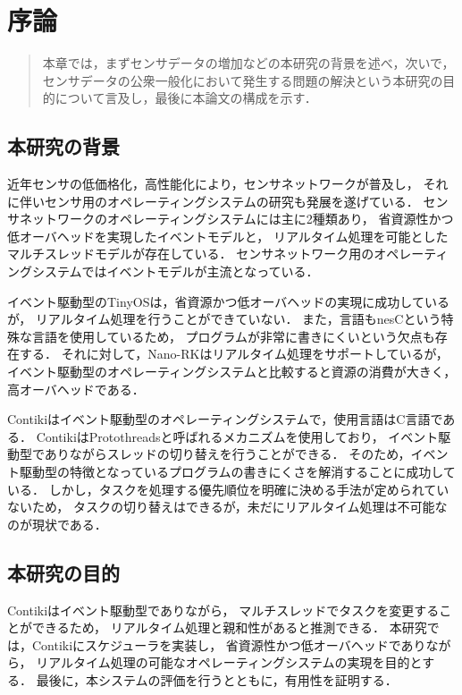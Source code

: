 \chapter{序論}
\begin{large}
\begin{quote}
本章では，まずセンサデータの増加などの本研究の背景を述べ，次いで，センサデータの公衆一般化において発生する問題の解決という本研究の目的について言及し，最後に本論文の構成を示す．
\end{quote}
\end{large}
\clearpage

\section{本研究の背景}
近年センサの低価格化，高性能化により，センサネットワークが普及し，
それに伴いセンサ用のオペレーティングシステムの研究も発展を遂げている．
センサネットワークのオペレーティングシステムには主に2種類あり，
省資源性かつ低オーバヘッドを実現したイベントモデルと，
リアルタイム処理を可能としたマルチスレッドモデルが存在している．
センサネットワーク用のオペレーティングシステムではイベントモデルが主流となっている．

イベント駆動型のTinyOSは，省資源かつ低オーバヘッドの実現に成功しているが，
リアルタイム処理を行うことができていない．
また，言語もnesCという特殊な言語を使用しているため，
プログラムが非常に書きにくいという欠点も存在する．
それに対して，Nano-RKはリアルタイム処理をサポートしているが，
イベント駆動型のオペレーティングシステムと比較すると資源の消費が大きく，
高オーバヘッドである．

Contikiはイベント駆動型のオペレーティングシステムで，使用言語はC言語である．
ContikiはProtothreadsと呼ばれるメカニズムを使用しており，
イベント駆動型でありながらスレッドの切り替えを行うことができる．
そのため，イベント駆動型の特徴となっているプログラムの書きにくさを解消することに成功している．
しかし，タスクを処理する優先順位を明確に決める手法が定められていないため，
タスクの切り替えはできるが，未だにリアルタイム処理は不可能なのが現状である．


\section{本研究の目的}
Contikiはイベント駆動型でありながら，
マルチスレッドでタスクを変更することができるため，
リアルタイム処理と親和性があると推測できる．
本研究では，Contikiにスケジューラを実装し，
省資源性かつ低オーバヘッドでありながら，
リアルタイム処理の可能なオペレーティングシステムの実現を目的とする．
最後に，本システムの評価を行うとともに，有用性を証明する．


